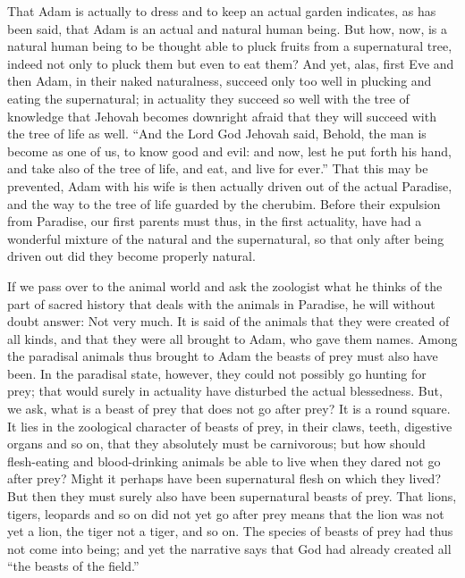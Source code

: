 \documentclass[12pt]{book}
\newcommand{\opage}[1]{\marginnote{\footnotesize\textit{[#1]}}}
\begin{document}
That Adam is actually to dress and to keep an actual
\opage{161}\setcounter{footnote}{0}%
garden indicates, as has been said, that Adam is an actual and natural
human being. But how, now, is a natural human being to be thought able
to pluck fruits from a supernatural tree, indeed not only to pluck them
but even to eat them? And yet, alas, first Eve and then Adam, in their
naked naturalness, succeed only too well in plucking and eating the
supernatural; in actuality they succeed so well with the tree of
knowledge that Jehovah becomes downright afraid that they will succeed
with the tree of life as well. ``And the Lord God Jehovah said, Behold,
the man is become as one of us, to know good and evil: and now, lest he
put forth his hand, and take also of the tree of life, and eat, and live
for ever.'' That this may be prevented, Adam with his wife is then
actually driven out of the actual Paradise, and the way to the tree of
life guarded by the cherubim. Before their expulsion from Paradise, our
first parents must thus, in the first actuality, have had a wonderful
mixture of the natural and the supernatural, so that only after being
driven out did they become properly natural.

If we pass over to the animal world and ask the zoologist what he thinks
of the part of sacred history that deals with the animals in Paradise,
he will without doubt answer: Not very much. It is said of the animals
that they were created of all kinds, and that they were all brought to
Adam, who gave them names. Among the paradisal animals thus brought to
Adam the beasts of prey must also have been. In the paradisal state,
however, they could not possibly go hunting for prey; that would surely
in actuality have disturbed the actual blessedness. But, we ask, what is
a beast of prey that does not go after prey? It is a round square. It
lies in the zoological
character of beasts of prey, in their claws, teeth, digestive organs and
so on, that they absolutely must be carnivorous; but
\opage{162}\setcounter{footnote}{0}%
how should flesh-eating and blood-drinking animals be able to live when
they dared not go after prey? Might it perhaps have been supernatural
flesh on which they lived? But then they must surely also have been
supernatural beasts of prey. That lions, tigers, leopards and so on did
not yet go after prey means that the lion was not yet a lion, the tiger
not a tiger, and so on. The species of beasts of prey had thus not come
into being; and yet the narrative says that God had already created all
``the beasts of the field.''
\end{document}
